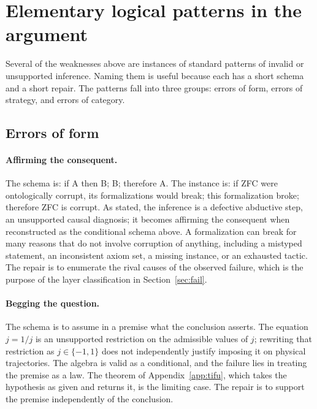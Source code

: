 \documentclass[11pt]{article}
\begin{document}
\section{Elementary logical patterns in the argument}
\label{sec:patterns}

Several of the weaknesses above are instances of standard patterns of invalid or unsupported inference. Naming them is useful because each has a short schema and a short repair. The patterns fall into three groups: errors of form, errors of strategy, and errors of category.

\subsection{Errors of form}

\paragraph{Affirming the consequent.} The schema is: if A then B; B; therefore A. The instance is: if ZFC were ontologically corrupt, its formalizations would break; this formalization broke; therefore ZFC is corrupt. As stated, the inference is a defective abductive step, an unsupported causal diagnosis; it becomes affirming the consequent when reconstructed as the conditional schema above. A formalization can break for many reasons that do not involve corruption of anything, including a mistyped statement, an inconsistent axiom set, a missing instance, or an exhausted tactic. The repair is to enumerate the rival causes of the observed failure, which is the purpose of the layer classification in Section~\ref{sec:fail}.

\paragraph{Begging the question.} The schema is to assume in a premise what the conclusion asserts. The equation $j=1/j$ is an unsupported restriction on the admissible values of $j$; rewriting that restriction as $j\in\{-1,1\}$ does not independently justify imposing it on physical trajectories. The algebra is valid as a conditional, and the failure lies in treating the premise as a law. The theorem of Appendix~\ref{app:tifu}, which takes the hypothesis as given and returns it, is the limiting case. The repair is to support the premise independently of the conclusion.
\end{document}
